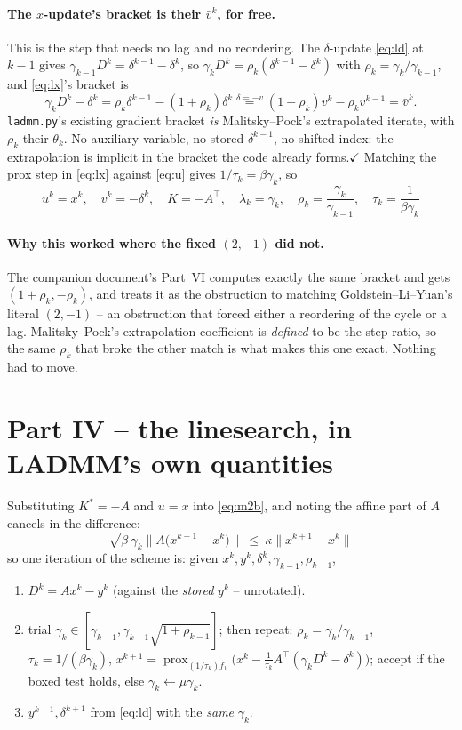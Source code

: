\documentclass[11pt]{article}
\newcommand{\code}[1]{\texttt{#1}}
\newcommand{\prox}{\operatorname{prox}}
\begin{document}
\paragraph{The $x$-update's bracket is their $\bar v^k$, for free.} This is the
step that needs no lag and no reordering. The $\delta$-update \eqref{eq:ld} at
$k-1$ gives $\gamma_{k-1}D^k=\delta^{k-1}-\delta^k$, so
$\gamma_kD^k=\rho_k(\delta^{k-1}-\delta^k)$ with $\rho_k=\gamma_k/\gamma_{k-1}$,
and \eqref{eq:lx}'s bracket is
\[
\gamma_kD^k-\delta^k=\rho_k\delta^{k-1}-(1+\rho_k)\delta^k
\overset{\delta=-v}{=}(1+\rho_k)v^k-\rho_kv^{k-1}=\bar v^k .
\]
\code{ladmm.py}'s existing gradient bracket \emph{is} Malitsky--Pock's
extrapolated iterate, with $\rho_k$ their $\theta_k$. No auxiliary variable, no
stored $\delta^{k-1}$, no shifted index: the extrapolation is implicit in the
bracket the code already forms.\quad$\checkmark$ Matching the prox step in
\eqref{eq:lx} against \eqref{eq:u} gives $1/\tau_k=\beta\gamma_k$, so
\[
\boxed{u^k=x^k,\quad v^k=-\delta^k,\quad K=-A^\top,\quad
\lambda_k=\gamma_k,\quad \rho_k=\frac{\gamma_k}{\gamma_{k-1}},\quad
\tau_k=\frac1{\beta\gamma_k}}
\]

\paragraph{Why this worked where the fixed $(2,-1)$ did not.} The companion
document's Part~VI computes exactly the same bracket and gets
$(1+\rho_k,-\rho_k)$, and treats it as the obstruction to matching
Goldstein--Li--Yuan's literal $(2,-1)$ -- an obstruction that forced either a
reordering of the cycle or a lag. Malitsky--Pock's extrapolation coefficient is
\emph{defined} to be the step ratio, so the same $\rho_k$ that broke the other
match is what makes this one exact. Nothing had to move.

\section*{Part IV -- the linesearch, in LADMM's own quantities}
Substituting $K^*=-A$ and $u=x$ into \eqref{eq:m2b}, and noting the affine part
of $A$ cancels in the difference:
\[
\boxed{\ \sqrt{\beta}\,\gamma_k\big\|A\big(x^{k+1}-x^k\big)\big\|\ \le\ \kappa\big\|x^{k+1}-x^k\big\|\ }
\]
so one iteration of the scheme is: given $x^k,y^k,\delta^k,\gamma_{k-1},\rho_{k-1}$,
\begin{enumerate}
\item[(1)] $D^k=Ax^k-y^k$ (against the \emph{stored} $y^k$ -- unrotated).
\item[(2)] trial $\gamma_k\in[\gamma_{k-1},\gamma_{k-1}\sqrt{1+\rho_{k-1}}]$; then repeat:
  $\rho_k=\gamma_k/\gamma_{k-1}$, $\tau_k=1/(\beta\gamma_k)$,
  $x^{k+1}=\prox_{(1/\tau_k)f_1}\big(x^k-\tfrac1{\tau_k}A^\top(\gamma_kD^k-\delta^k)\big)$;
  accept if the boxed test holds, else $\gamma_k\leftarrow\mu\gamma_k$.
\item[(3)] $y^{k+1},\delta^{k+1}$ from \eqref{eq:ld} with the \emph{same} $\gamma_k$.
\end{enumerate}
\end{document}
